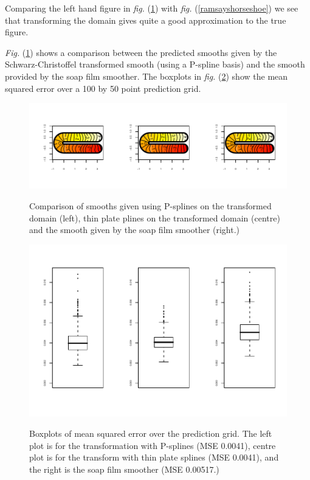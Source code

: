 \documentclass[a4paper,10pt]{amsart}
\newcommand{\sch}{Schwarz-Christoffel }
\newcommand{\fig}[1]{\emph{fig.} (\ref{#1})}
\newcommand{\Fig}[1]{\emph{Fig.} (\ref{#1})}
\begin{document}
Comparing the left hand figure in \fig{compsmooth} with \fig{ramsayshorseshoe} we see that transforming the domain gives quite a good approximation to the true figure.

\Fig{compsmooth} shows a comparison between the predicted smooths given by the \sch transformed smooth (using a P-spline basis) and the smooth provided by the soap film smoother. The boxplots in \fig{scvssoapboxplot} show the mean squared error over a 100 by 50 point prediction grid.

\begin{figure}
\centering
\includegraphics[trim=0.5in 0.5in 0in 0in]{figs/compsmooth.pdf} \\
\caption{Comparison of smooths given using P-splines on the transformed domain (left), thin plate plines on the transformed domain (centre) and the smooth given by the soap film smoother (right.)}
\label{compsmooth}
\end{figure}

\begin{figure}
\centering
\includegraphics[trim=0.5in 0in 0in 0in]{figs/scvssoapboxplot.pdf} \\
\caption{Boxplots of mean squared error over the prediction grid. The left plot is for the transformation with P-splines (MSE 0.0041), centre plot is for the transform with thin plate splines (MSE 0.0041), and the right is the soap film smoother (MSE 0.00517.)} 
\label{scvssoapboxplot}
\end{figure}
\end{document}
